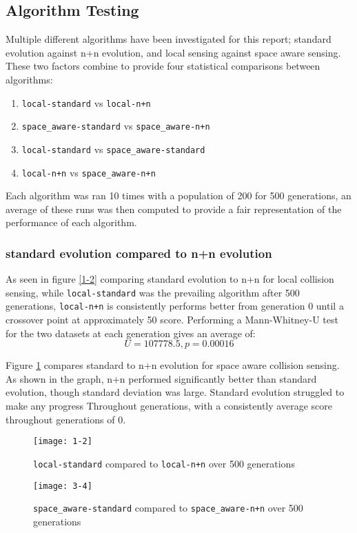 \subsection{Algorithm Testing}
Multiple different algorithms have been investigated for this report; standard evolution against n+n evolution, and local sensing against space aware sensing. These two factors combine to provide four statistical comparisons between algorithms:
\begin{enumerate}
  \item \verb|local-standard| vs \verb|local-n+n|
  \item \verb|space_aware-standard| vs \verb|space_aware-n+n|
  \item \verb|local-standard| vs \verb|space_aware-standard|
  \item \verb|local-n+n| vs \verb|space_aware-n+n|
\end{enumerate}
Each algorithm was ran 10 times with a population of 200 for 500 generations, an average of these runs was then computed to provide a fair representation of the performance of each algorithm. 

\subsubsection{standard evolution compared to n+n evolution}

As seen in figure \ref{1-2} comparing standard evolution to n+n for local collision sensing, while \verb|local-standard| was the prevailing algorithm after 500 generations, \verb|local-n+n| is consistently performs better from generation 0 until a crossover point at approximately 50 score. Performing a Mann-Whitney-U test for the two datasets at each generation gives an average of: 
$$
U = 107778.5, p = 0.00016
$$

Figure \ref{3-4} compares standard to n+n evolution for space aware collision sensing. As shown in the graph, n+n performed significantly better than standard evolution, though standard deviation was large. Standard evolution struggled to make any progress Throughout generations, with a consistently average score throughout generations of 0.

\begin{figure}[h]
  \centering
  \begin{minipage}{.5\textwidth}
    \centering
    \captionsetup{width=.8\linewidth}
    \texttt{[image: 1-2]}
    \caption{\texttt{local-standard} compared to \texttt{local-n+n} over 500 generations}
    \label{1-2}
  \end{minipage}%
  \begin{minipage}{.5\textwidth}
    \centering
    \captionsetup{width=.8\linewidth}
    \texttt{[image: 3-4]}
    \caption{\texttt{space\_aware-standard} compared to \texttt{space\_aware-n+n} over 500 generations}
    \label{3-4}
  \end{minipage}
\end{figure}

